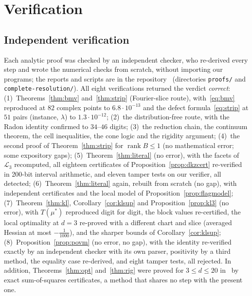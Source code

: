 \documentclass[11pt]{article}
\theoremstyle{remark}
\numberwithin{equation}{section}
\newcommand{\cL}{\mathcal{L}}
\begin{document}
\section{Verification}\label{sec:verification}

\subsection{Independent verification}\label{subsec:independent}
Each analytic proof was checked by an independent checker, who re-derived every step and wrote the numerical checks
from scratch, without importing our programs; the reports and scripts are in the repository~\cite{repo} (directories
\texttt{proofs/} and \texttt{complete-resolution/}). All eight verifications returned the verdict \emph{correct}:
(1)~Theorems~\ref{thm:bmv} and~\ref{thm:strip} (Fourier-slice route), with~\eqref{eq:bmv} reproduced at $82$ complex
points to $6.8\cdot10^{-13}$ and the defect formula~\eqref{eq:strip} at $51$ pairs (instance, $\lambda$) to
$1.3\cdot10^{-12}$; (2)~the distribution-free route, with the Radon identity confirmed to $34$--$46$ digits; (3)~the
reduction chain, the continuum theorem, the cell inequalities, the cone logic and the rigidity argument; (4)~the second
proof of Theorem~\ref{thm:strip} for $\operatorname{rank}B\le1$ (no mathematical error; some expository gaps);
(5)~Theorem~\ref{thm:literal} (no error), with the facets of $\cL_3$ recomputed, all eighteen certificates of
Proposition~\ref{prop:dkzcert} re-verified in 200-bit interval arithmetic, and eleven tamper tests on our verifier, all
detected; (6)~Theorem~\ref{thm:literal} again, rebuilt from scratch (no gap), with independent certificates and the local
model of Proposition~\ref{prop:flagmodel}; (7)~Theorem~\ref{thm:kl}, Corollary~\ref{cor:klsup} and
Proposition~\ref{prop:kl3} (no error), with $T(\mu^*)$ reproduced digit for digit, the block values re-certified, the
local optimality at $d=3$ re-proved with a different chart and slice (averaged Hessian at most $-\frac1{1000}$), and the
sharper bounds of Corollary~\ref{cor:klsup}; (8)~Proposition~\ref{prop:povm} (no error, no gap), with the identity
re-verified exactly by an independent checker with its own parser, positivity by a third method, the equality case
re-derived, and eight tamper tests, all rejected. In addition, Theorems~\ref{thm:opt} and~\ref{thm:rig} were proved for $3\le d\le20$ in~\cite{repoCGLMP} by exact
sum-of-squares certificates, a method that shares no step with the present one.
\end{document}
